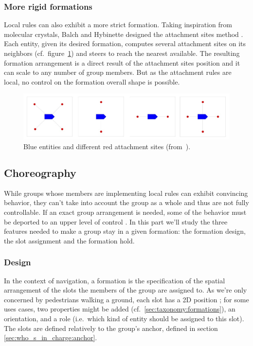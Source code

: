 \documentclass[a4paper,titlepage]{article}
\begin{document}
\subsubsection{More rigid formations}

Local rules can also exhibit a more strict formation. Taking inspiration from molecular crystals, Balch and Hybinette designed the attachment sites method \cite{Balch:2000bn}. Each entity, given its desired formation, computes several attachment sites on its neighbors (cf.\ figure~\ref{fig:attachment_sites}) and steers to reach the nearest available. The resulting formation arrangement is a direct result of the attachment sites position and it can scale to any number of group members. But as the attachment rules are local, no control on the formation overall shape is possible. 

\begin{figure}[h]
\centering
\includegraphics[width=\textwidth]{AttachmentSites.jpg}
\caption{Blue entities and different red attachment sites (from~\cite{Balch:2000bn}).}
\label{fig:attachment_sites}
\end{figure} 

\subsection{Choreography}
\label{sec:stay_grouped:choreography}

While groups whose members are implementing local rules can exhibit convincing behavior, they can’t take into account the group as a whole and thus are not fully controllable. If an exact group arrangement is needed, some of the behavior must be deported to an upper level of control \cite{MusTha2001}. In this part we’ll study the three features needed to make a group stay in a given formation: the formation design, the slot assignment and the formation hold.

\subsubsection{Design}

In the context of navigation, a formation is the specification of the spatial arrangement of the slots the members of the group are assigned to. As we're only concerned by pedestrians walking a ground, each slot has a 2D position ; for some uses cases, two properties might be added (cf.\ \ref{sec:taxonomy:formations}), an orientation, and a role (i.e.\ which kind of entity should be assigned to this slot). The slots are defined relatively to the group's anchor, defined in section \ref{sec:who_s_in_charge:anchor}.
\end{document}
